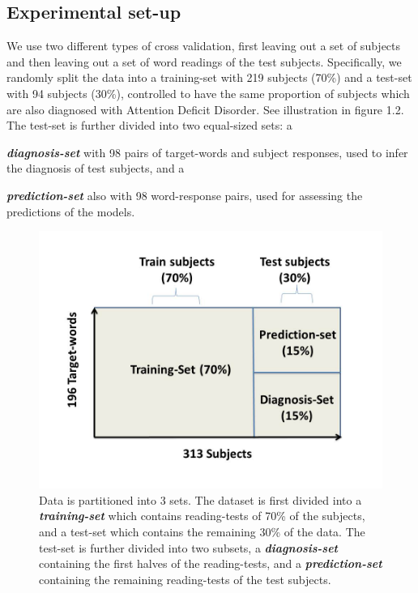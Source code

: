 \subsection{Experimental set-up}
We use two different types of cross validation, first leaving out a set of subjects and then leaving out a set of word readings of the test subjects. Specifically, we randomly split the data into a training-set with 219 subjects (70\%) and a test-set with 94 subjects (30\%), controlled to have the same proportion of subjects which are also diagnosed with Attention Deficit Disorder. See illustration in figure 1.2. The test-set is further divided into two equal-sized sets: a {\textit {\textbf {diagnosis-set}} with 98 pairs of target-words and subject responses, used to infer the diagnosis of test subjects, and a {\textit {\textbf {prediction-set}} also with 98 word-response pairs, used for assessing the predictions of the models. 

\begin{figure}[H]
\vspace{.3in}
\includegraphics[width=\linewidth]{Figures/Ch1/trainTest2}
\caption{Data is partitioned into 3 sets. The dataset is first divided into a \textit {\textbf {training-set}} which contains reading-tests of 70\% of the subjects, and a test-set which contains the remaining 30\% of the data. The test-set is further divided into two subsets, a \textit {\textbf {diagnosis-set}} containing the first halves of the reading-tests, and a \textit {\textbf {prediction-set}} containing the remaining reading-tests of the test subjects.}
\end{figure}

}}
